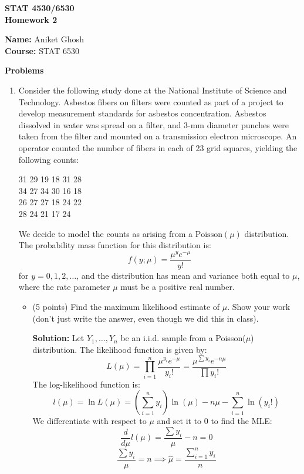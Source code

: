 \documentclass[12pt,letterpaper]{article}
\begin{document}
\large
\begin{center} 
\textbf{STAT 4530/6530}\\[1ex]
\textbf{Homework 2}
\end{center}

\vspace{4mm}
\normalsize
\textbf{Name:} Aniket Ghosh\\
\textbf{Course:} STAT 6530\\


\vspace{4mm}

\textbf{Problems}

\noindent 

\begin{enumerate}[leftmargin=*]

\item Consider the following study done at the National Institute of Science and Technology. Asbestos fibers on filters were counted as part of a project to develop measurement standards for asbestos concentration. Asbestos dissolved in water was spread on a filter, and 3-mm diameter punches were taken from the filter and mounted on a transmission electron microscope. An operator counted the number of fibers in each of 23 grid squares, yielding the following counts:
\begin{center}
31 29 19 18 31 28 \\
34 27 34 30 16 18 \\
26 27 27 18 24 22 \\
28 24 21 17 24 
\end{center}
We decide to model the counts as arising from a $\text{Poisson}(\mu)$ distribution. The probability mass function for this distribution is:
\begin{equation*}
f(y ; \mu) = \frac{\mu^y e^{-\mu}}{y!} 
\end{equation*}
for $ y = 0, 1, 2, \dots$, and the distribution has mean and variance both equal to $\mu$, where the rate parameter $\mu$ must be a positive real number.
\begin{itemize}
    \item [(a)] (5 points) Find the maximum likelihood estimate of $\mu$. Show your work (don't just write the answer, even though we did this in class).
    
    \textbf{Solution:}
    Let $Y_1, \dots, Y_n$ be an i.i.d. sample from a Poisson($\mu$) distribution. The likelihood function is given by:
    \[ L(\mu) = \prod_{i=1}^{n} \frac{\mu^{y_i} e^{-\mu}}{y_i!} = \frac{\mu^{\sum y_i} e^{-n\mu}}{\prod y_i!} \]
    The log-likelihood function is:
    \[ l(\mu) = \ln L(\mu) = (\sum_{i=1}^{n} y_i) \ln(\mu) - n\mu - \sum_{i=1}^{n} \ln(y_i!) \]
     We differentiate with respect to $\mu$ and set it to 0 to find the MLE:
    \[ \frac{d}{d\mu} l(\mu) = \frac{\sum y_i}{\mu} - n = 0 \]
    \[ \frac{\sum y_i}{\mu} = n 
    \implies \hat{\mu} = \frac{\sum_{i=1}^{n} y_i}{n}\]
    

\end{itemize}
\end{enumerate}
\end{document}
